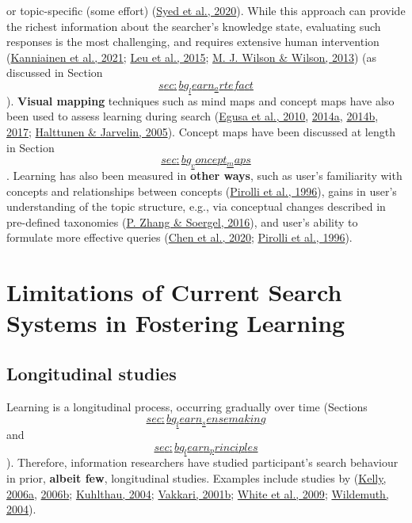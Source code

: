 \documentclass[a4paper, nobind]{templates/ociamthesis}
\begin{document}
or topic-specific (some effort) (\protect\hyperlink{ref-syed2020improving}{Syed et al., 2020}). While this
approach can provide the richest information about the searcher's
knowledge state, evaluating such responses is the most challenging, and
requires extensive human intervention
(\protect\hyperlink{ref-kanniainen2021assessing}{Kanniainen et al., 2021}; \protect\hyperlink{ref-leu2015new}{Leu et al., 2015}; \protect\hyperlink{ref-wilson2013comparison}{M. J. Wilson \& Wilson, 2013}) (as
discussed in Section
\protect\hyperlink{sec:bg_learn_artefact}{\[sec:bg_learn_artefact\]}). \textbf{Visual mapping} techniques such
as mind maps and concept maps have also been used to assess learning
during search
(\protect\hyperlink{ref-egusa2010usingb}{Egusa et al., 2010}, \protect\hyperlink{ref-egusa2014howd}{2014a}, \protect\hyperlink{ref-egusa2014howe}{2014b}, \protect\hyperlink{ref-egusa2017evaluating}{2017}; \protect\hyperlink{ref-halttunen2005assessing}{Halttunen \& Jarvelin, 2005}).
Concept maps have been discussed at length in Section
\protect\hyperlink{sec:bg_concept_maps}{\[sec:bg_concept_maps\]}. Learning has also been measured in
\textbf{other ways}, such as user's familiarity with concepts and
relationships between concepts (\protect\hyperlink{ref-pirolli1996scatter}{Pirolli et al., 1996}), gains in user's
understanding of the topic structure, e.g., via conceptual changes
described in pre-defined taxonomies (\protect\hyperlink{ref-zhang2016process}{P. Zhang \& Soergel, 2016}), and user's
ability to formulate more effective queries
(\protect\hyperlink{ref-chen2020understanding}{Chen et al., 2020}; \protect\hyperlink{ref-pirolli1996scatter}{Pirolli et al., 1996}).

\hypertarget{limitations-of-current-search-systems-in-fostering-learning}{%
\section{Limitations of Current Search Systems in Fostering Learning}\label{limitations-of-current-search-systems-in-fostering-learning}}

\hypertarget{sec:bg_search_longitudinal_studies}{%
\subsection{Longitudinal studies}\label{sec:bg_search_longitudinal_studies}}

Learning is a longitudinal process, occurring gradually over time
(Sections
\protect\hyperlink{sec:bg_learn_sensemaking}{\[sec:bg_learn_sensemaking\]} and
\protect\hyperlink{sec:bg_learn_principles}{\[sec:bg_learn_principles\]}). Therefore, information
researchers have studied participant's search behaviour in prior,
\textbf{albeit few}, longitudinal studies. Examples include studies by
(\protect\hyperlink{ref-kelly2006measuring_a}{Kelly, 2006a}, \protect\hyperlink{ref-kelly2006measuring_b}{2006b}; \protect\hyperlink{ref-kuhlthau2004seeking}{Kuhlthau, 2004}; \protect\hyperlink{ref-vakkari2001changes}{Vakkari, 2001b}; \protect\hyperlink{ref-white2009characterizing}{White et al., 2009}; \protect\hyperlink{ref-wildemuth2004effects}{Wildemuth, 2004}).
\end{document}
